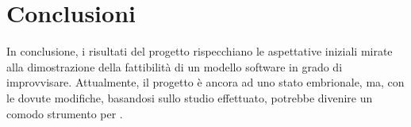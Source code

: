 \section{Conclusioni}
In conclusione, i risultati del progetto rispecchiano le aspettative iniziali
mirate alla dimostrazione della fattibilità di un modello software in grado di improvvisare.
Attualmente, il progetto è ancora ad uno stato embrionale, ma, con le dovute
modifiche, basandosi sullo studio effettuato, potrebbe divenire un comodo
strumento per .\\

